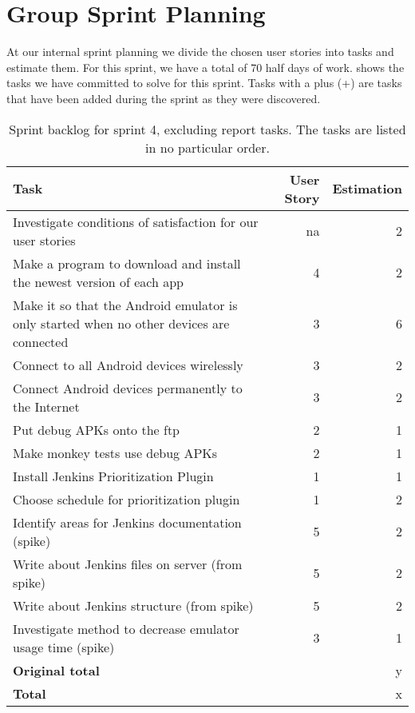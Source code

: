 \section{Group Sprint Planning}\label{sec:S4_group}
At our internal sprint planning we divide the chosen user stories into tasks and estimate them. For this sprint, we have a total of 70 half days of work.  shows the tasks we have committed to solve for this sprint. Tasks with a plus (+) are tasks that have been added during the sprint as they were discovered.

\begin{table}%
  \centering
  \begin{tabular}{p{}rr}
    \toprule
    \textbf{Task} & \textbf{User Story} & \textbf{Estimation} \\
    \midrule
    Investigate conditions of satisfaction for our user stories & na & 2 \\
    Make a program to download and install the newest version of each app & 4 & 2 \\
    Make it so that the Android emulator is only started when no other devices are connected & 3 & 6 \\
    Connect to all Android devices wirelessly & 3 & 2 \\
    Connect Android devices permanently to the Internet & 3 & 2 \\
    Put debug APKs onto the ftp & 2 & 1 \\
    Make monkey tests use debug APKs & 2 & 1 \\
    Install Jenkins Prioritization Plugin & 1 & 1 \\
    Choose schedule for prioritization plugin & 1 & 2 \\
    Identify areas for Jenkins documentation (spike) & 5 & 2 \\
    Write about Jenkins files on server (from spike) & 5 & 2 \\
    Write about Jenkins structure (from spike) & 5 & 2 \\
    Investigate method to decrease emulator usage time (spike) & 3 & 1 \\
    \midrule
    \textbf{Original total} & & y \\
    \textbf{Total} & & x \\
    \bottomrule
  \end{tabular}
\caption[Sprint 4 backlog]{Sprint backlog for sprint 4, excluding report tasks. The tasks are listed in no particular order.}
\label{tab:sprint4_tasks}
\end{table}


